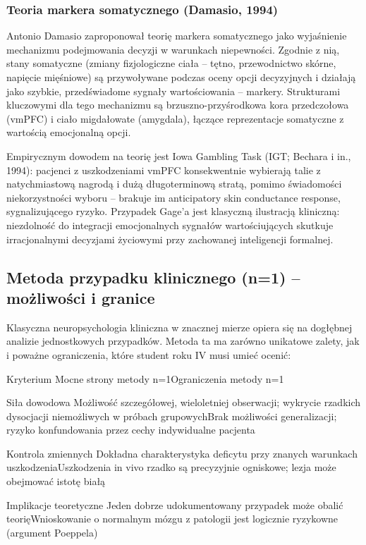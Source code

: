 \documentclass[11pt,a4paper]{article}
\begin{document}
\subsubsection{Teoria markera somatycznego (Damasio, 1994)}
Antonio Damasio zaproponował teorię markera somatycznego jako wyjaśnienie mechanizmu podejmowania
decyzji w warunkach niepewności. Zgodnie z nią, stany somatyczne (zmiany fizjologiczne ciała – tętno,
przewodnictwo skórne, napięcie mięśniowe) są przywoływane podczas oceny opcji decyzyjnych i działają jako
szybkie, przedświadome sygnały wartościowania – markery. Strukturami kluczowymi dla tego mechanizmu są
brzuszno-przyśrodkowa kora przedczołowa (vmPFC) i ciało migdałowate (amygdala), łączące reprezentacje
somatyczne z wartością emocjonalną opcji.

Empirycznym dowodem na teorię jest Iowa Gambling Task (IGT; Bechara i in., 1994): pacjenci z uszkodzeniami
vmPFC konsekwentnie wybierają talie z natychmiastową nagrodą i dużą długoterminową stratą, pomimo
świadomości niekorzystności wyboru – brakuje im anticipatory skin conductance response, sygnalizującego
ryzyko. Przypadek Gage'a jest klasyczną ilustracją kliniczną: niezdolność do integracji emocjonalnych sygnałów
wartościujących skutkuje irracjonalnymi decyzjami życiowymi przy zachowanej inteligencji formalnej.

\subsection{Metoda przypadku klinicznego (n=1) – możliwości i granice}
Klasyczna neuropsychologia kliniczna w znacznej mierze opiera się na dogłębnej analizie jednostkowych
przypadków. Metoda ta ma zarówno unikatowe zalety, jak i poważne ograniczenia, które student roku IV musi
umieć ocenić:

Kryterium
Mocne strony metody n=1Ograniczenia metody n=1

Siła dowodowa
Możliwość szczegółowej, wieloletniej obserwacji; wykrycie rzadkich dysocjacji niemożliwych w próbach grupowychBrak możliwości generalizacji; ryzyko konfundowania przez cechy indywidualne pacjenta

Kontrola zmiennych
Dokładna charakterystyka deficytu przy znanych warunkach uszkodzeniaUszkodzenia in vivo rzadko są precyzyjnie ogniskowe; lezja może obejmować istotę białą

Implikacje teoretyczne
Jeden dobrze udokumentowany przypadek może obalić teorięWnioskowanie o normalnym mózgu z patologii jest logicznie ryzykowne (argument Poeppela)
\end{document}

